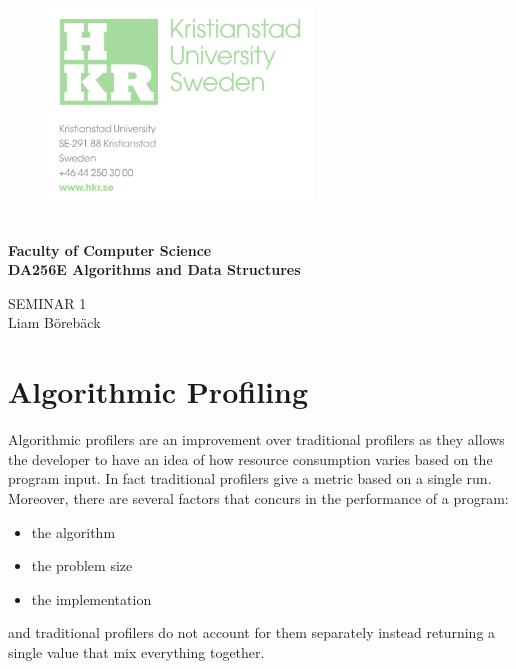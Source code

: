 \documentclass{article}
\begin{document}
	
	\begin{figure}[h!]

			\includegraphics[width=7cm]{images/hkr.png}
			\label{title}
	   \endminipage
		\endminipage
	\end{figure}
	
	\vspace{0.8cm}
	\Large

	\textbf{\\ Faculty of Computer Science\\ DA256E Algorithms and Data Structures}
	\begin{center}
	\vspace{4cm}
	\Huge
	SEMINAR 1\\
	\vspace{2cm}
	\LARGE
	Liam Börebäck
	\end{center}
	
\thispagestyle{empty}       %

\newpage
	
\tableofcontents
\large
\thispagestyle{empty}        %

\newpage
\listoffigures
\listoftables

\newpage

\section*{Algorithmic Profiling}

Algorithmic profilers are an improvement over traditional profilers as they allows the developer to have an idea of how resource consumption varies based on the program input. In fact traditional profilers give a metric based on a single run. Moreover, there are several factors that concurs in the performance of a program:
\begin{itemize}
    \item the algorithm
    \item the problem size
    \item the implementation
\end{itemize}
and traditional profilers do not account for them separately instead returning a single value that mix everything together.\\
\end{document}

